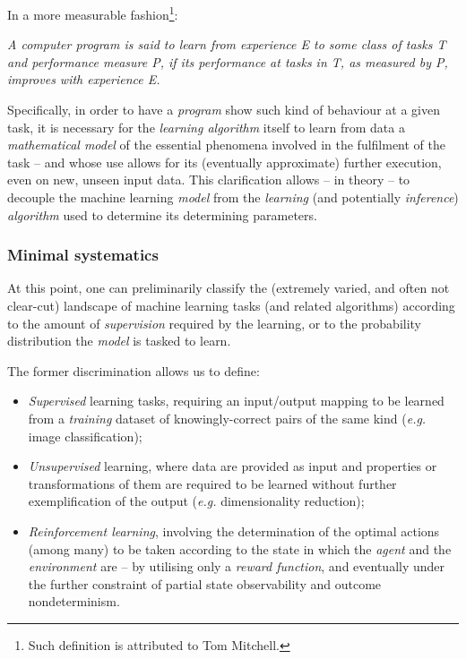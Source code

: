 In a more measurable fashion\footnote{Such definition is attributed to Tom Mitchell.}:

\begin{displayquote}
    \textit{A computer program is said to learn from experience E \wrt to some class of tasks T and performance measure P, if its performance at tasks in T, as measured by P, improves with experience E.}
\end{displayquote}

Specifically, in order to have a \textit{program} show such kind of behaviour at a given task, it is necessary for the \textit{learning algorithm} itself to learn from data a \textit{mathematical model} of the essential phenomena involved in the fulfilment of the task -- and whose use allows for its (eventually approximate) further execution, even on new, unseen input data. This clarification allows -- in theory -- to decouple the machine learning \textit{model} from the \textit{learning} (and potentially \textit{inference}) \textit{algorithm} used to determine its determining parameters.

\subsubsection{Minimal systematics}
At this point, one can preliminarily classify the (extremely varied, and often not clear-cut) landscape of machine learning tasks (and related algorithms) according to the amount of \textit{supervision} required by the learning, or \wrt to the probability distribution the \textit{model} is tasked to learn.

The former discrimination allows us to define:
\begin{itemize}
    \item \textit{Supervised} learning tasks, requiring an input/output mapping to be learned from a \textit{training} dataset of knowingly-correct pairs of the same kind (\textit{e.g.} image classification);
    \item \textit{Unsupervised} learning, where data are provided as input and properties or transformations of them are required to be learned without further exemplification of the output (\textit{e.g.} dimensionality reduction);
    \item \textit{Reinforcement learning}, involving the determination of the optimal actions (among many) to be taken according to the state in which the \textit{agent} and the \textit{environment} are -- by utilising only a \textit{reward function}, and eventually under the further constraint of partial state observability and outcome nondeterminism.
\end{itemize}

